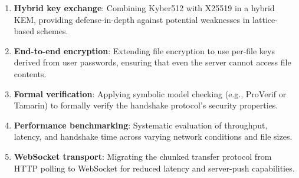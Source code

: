 \documentclass[12pt, a4paper]{article}
\begin{document}
\begin{enumerate}[label=\arabic*., itemsep=2pt]
    \item \textbf{Hybrid key exchange}: Combining Kyber512 with X25519 in a hybrid KEM, providing defense-in-depth against potential weaknesses in lattice-based schemes.
    \item \textbf{End-to-end encryption}: Extending file encryption to use per-file keys derived from user passwords, ensuring that even the server cannot access file contents.
    \item \textbf{Formal verification}: Applying symbolic model checking (e.g., ProVerif or Tamarin) to formally verify the handshake protocol's security properties.
    \item \textbf{Performance benchmarking}: Systematic evaluation of throughput, latency, and handshake time across varying network conditions and file sizes.
    \item \textbf{WebSocket transport}: Migrating the chunked transfer protocol from HTTP polling to WebSocket for reduced latency and server-push capabilities.
\end{enumerate}

\newpage
\printbibliography[title={References}]
\end{document}
